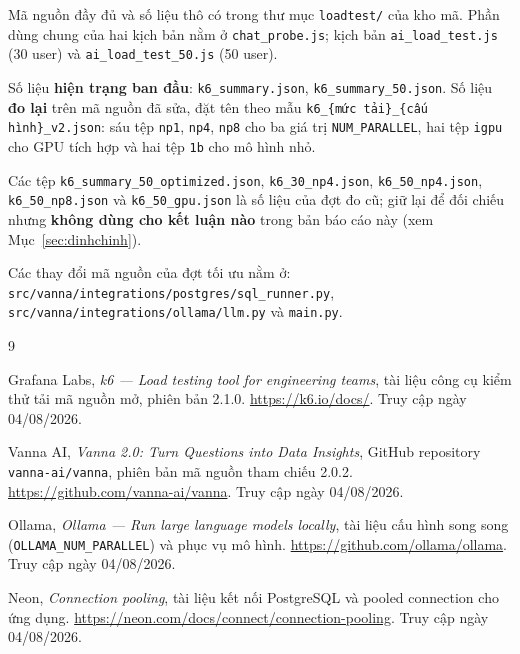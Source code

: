 \documentclass[12pt,a4paper]{article}
\begin{document}
\noindent Mã nguồn đầy đủ và số liệu thô có trong thư mục \texttt{loadtest/} của
kho mã. Phần dùng chung của hai kịch bản nằm ở \texttt{chat\_probe.js}; kịch bản
\texttt{ai\_load\_test.js} (30 user) và \texttt{ai\_load\_test\_50.js} (50 user).

\noindent Số liệu \textbf{hiện trạng ban đầu}: \texttt{k6\_summary.json},
\texttt{k6\_summary\_50.json}. Số liệu \textbf{đo lại} trên mã nguồn đã sửa, đặt
tên theo mẫu \texttt{k6\_\{mức tải\}\_\{cấu hình\}\_v2.json}: sáu tệp
\texttt{np1}, \texttt{np4}, \texttt{np8} cho ba giá trị \texttt{NUM\_PARALLEL},
hai tệp \texttt{igpu} cho GPU tích hợp và hai tệp \texttt{1b} cho mô hình nhỏ.

\noindent Các tệp \texttt{k6\_summary\_50\_optimized.json},
\texttt{k6\_30\_np4.json}, \texttt{k6\_50\_np4.json}, \texttt{k6\_50\_np8.json} và
\texttt{k6\_50\_gpu.json} là số liệu của đợt đo cũ; giữ lại để đối chiếu nhưng
\textbf{không dùng cho kết luận nào} trong bản báo cáo này (xem
Mục~\ref{sec:dinhchinh}).

\vspace{0.3cm}
\noindent Các thay đổi mã nguồn của đợt tối ưu nằm ở:
\texttt{src/vanna/integrations/postgres/sql\_runner.py},
\texttt{src/vanna/integrations/ollama/llm.py} và \texttt{main.py}.

\clearpage
\renewcommand{\refname}{Tài liệu tham khảo}
\begin{thebibliography}{9}

Grafana Labs,
\textit{k6 --- Load testing tool for engineering teams},
tài liệu công cụ kiểm thử tải mã nguồn mở, phiên bản 2.1.0.
\url{https://k6.io/docs/}.
Truy cập ngày 04/08/2026.

Vanna AI,
\textit{Vanna 2.0: Turn Questions into Data Insights},
GitHub repository \texttt{vanna-ai/vanna}, phiên bản mã nguồn tham chiếu 2.0.2.
\url{https://github.com/vanna-ai/vanna}.
Truy cập ngày 04/08/2026.

Ollama,
\textit{Ollama --- Run large language models locally},
tài liệu cấu hình song song (\texttt{OLLAMA\_NUM\_PARALLEL}) và phục vụ mô hình.
\url{https://github.com/ollama/ollama}.
Truy cập ngày 04/08/2026.

Neon,
\textit{Connection pooling},
tài liệu kết nối PostgreSQL và pooled connection cho ứng dụng.
\url{https://neon.com/docs/connect/connection-pooling}.
Truy cập ngày 04/08/2026.

\end{thebibliography}
\end{document}
